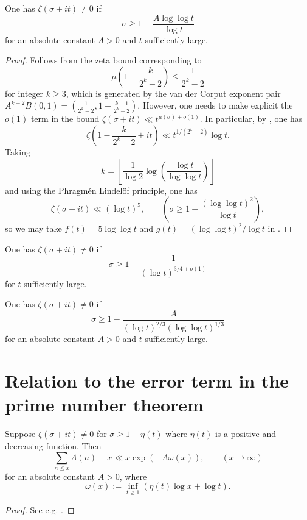 \begin{theorem}\label{zfr-littlewood}
One has $\zeta(\sigma + it) \ne 0$ if 
\[
\sigma \ge 1 - \frac{A \log\log t}{\log t}
\]
for an absolute constant $A > 0$ and $t$ sufficiently large.
\end{theorem}
\begin{proof}
Follows from the zeta bound corresponding to
\[
\mu(1 - \frac{k}{2^k - 2}) \le \frac{1}{2^k - 2}
\]
for integer $k\ge 3$, which is generated by the van der Corput exponent pair $A^{k - 2}B(0, 1) = (\frac{1}{2^k - 2}, 1 - \frac{k - 1}{2^k - 2})$. However, one needs to make explicit the $o(1)$ term in the bound $\zeta(\sigma + it) \ll t^{\mu(\sigma) + o(1)}$. In particular, by \cite[Theorem 5.14]{titchmarsh_theory_1986}, one has 
\[
\zeta(1 - \frac{k}{2^k - 2} + it) \ll t^{1/(2^k - 2)}\log t.
\]
Taking 
\[
k = \left\lfloor \frac{1}{\log 2}\log\left(\frac{\log t}{\log\log t}\right)\right\rfloor
\]
and using the Phragm\'en Lindel\"of principle, one has 
\[
\zeta(\sigma + it) \ll (\log t)^5,\qquad (\sigma \ge 1 - \frac{(\log\log t)^2}{\log t}),
\]
so we may take $f(t) = 5\log\log t$ and $g(t) = (\log\log t)^2/\log t$ in .
\end{proof}

\begin{theorem}\label{zfr-chudakov}
One has $\zeta(\sigma + it) \ne 0$ if 
\[
\sigma \ge 1 - \frac{1}{(\log t)^{3/4 + o(1)}}
\]
for $t$ sufficiently large.
\end{theorem}

\begin{theorem}\label{zfr-vk}
One has $\zeta(\sigma + it) \ne 0$ if 
\[
\sigma \ge 1 - \frac{A}{(\log t)^{2/3}(\log\log t)^{1/3}}
\]
for an absolute constant $A > 0$ and $t$ sufficiently large.
\end{theorem}

\section{Relation to the error term in the prime number theorem}

\begin{lemma}\label{zero_free_to_pnt}
Suppose $\zeta(\sigma + it) \ne 0$ for $\sigma \ge 1 - \eta(t)$ where $\eta(t)$ is a positive and decreasing function. Then
\[
\sum_{n \le x}\Lambda(n) - x \ll x \exp\left(-A \omega(x) \right),\qquad (x \to \infty)
\]
for an absolute constant $A > 0$, where 
\[
\omega(x) := \inf_{t \ge 1}(\eta (t) \log x + \log t).
\]
\end{lemma}
\begin{proof}
See e.g. \cite{ingham_distribution_1990}.
\end{proof}

